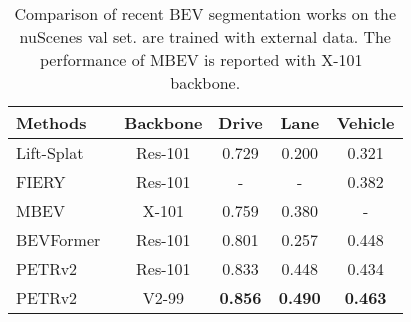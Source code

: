 \documentclass[10pt,twocolumn,letterpaper]{article}
\begin{document}
\begin{table*}[t!]
\begin{center}
\begin{tabular}{l|c|ccccccc}
\hline
\end{tabular}
\end{center}
\end{table*}

\begin{table}[t]
\begin{center}
\caption{Comparison of recent BEV segmentation works on the nuScenes val set.  are trained with external data. The performance of MBEV is reported with X-101~\cite{xie2017aggregated} backbone.}
\label{seg_compare}
\setlength{\tabcolsep}{5pt}
\begin{tabular}{l|c|ccc}
\hline
Methods & Backbone  & Drive & Lane & Vehicle  \\
\hline
Lift-Splat~\cite{philion2020lift} & Res-101&0.729 &0.200 &0.321   \\
FIERY~\cite{hu2021fiery} & Res-101& - &- &0.382 \\
MBEV~\cite{xie2022m} & X-101&0.759 &0.380 &- \\
BEVFormer~\cite{li2022bevformer} & Res-101& 0.801 &0.257 &0.448 \\
\hline

PETRv2 & Res-101  &0.833 &0.448 &0.434   \\


PETRv2 & V2-99  &\textbf{0.856} &\textbf{0.490} &\textbf{0.463}   \\


\hline
\end{tabular}
\end{center}
\vspace{-1.5em}
\end{table}
\end{document}
